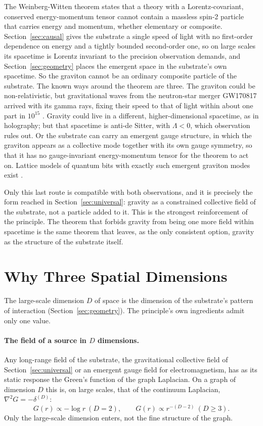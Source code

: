 \documentclass[aps,prd,onecolumn,nofootinbib,superscriptaddress]{revtex4-2}
\begin{document}
The Weinberg-Witten theorem \cite{weinbergwitten1980} states that a theory with a Lorentz-covariant, conserved energy-momentum tensor cannot contain a massless spin-2 particle that carries energy and momentum, whether elementary or composite. Section~\ref{sec:causal} gives the substrate a single speed of light with no first-order dependence on energy and a tightly bounded second-order one, so on large scales its spacetime is Lorentz invariant to the precision observation demands, and Section~\ref{sec:geometry} places the emergent space in the substrate's own spacetime. So the graviton cannot be an ordinary composite particle of the substrate. The known ways around the theorem \cite{carlip2014} are three. The graviton could be non-relativistic, but gravitational waves from the neutron-star merger GW170817 arrived with its gamma rays, fixing their speed to that of light within about one part in $10^{15}$ \cite{gw170817}. Gravity could live in a different, higher-dimensional spacetime, as in holography; but that spacetime is anti-de Sitter, with $\Lambda<0$, which observation rules out. Or the substrate can carry an emergent gauge structure, in which the graviton appears as a collective mode together with its own gauge symmetry, so that it has no gauge-invariant energy-momentum tensor for the theorem to act on. Lattice models of quantum bits with exactly such emergent graviton modes exist \cite{guwen2012}.

Only this last route is compatible with both observations, and it is precisely the form reached in Section~\ref{sec:universal}: gravity as a constrained collective field of the substrate, not a particle added to it. This is the strongest reinforcement of the principle. The theorem that forbids gravity from being one more field within spacetime is the same theorem that leaves, as the only consistent option, gravity as the structure of the substrate itself.

\section{Why Three Spatial Dimensions}
\label{sec:three}

The large-scale dimension $D$ of space is the dimension of the substrate's pattern of interaction (Section~\ref{sec:geometry}). The principle's own ingredients admit only one value.

\paragraph{The field of a source in $D$ dimensions.} Any long-range field of the substrate, the gravitational collective field of Section~\ref{sec:universal} or an emergent gauge field for electromagnetism, has as its static response the Green's function of the graph Laplacian. On a graph of dimension $D$ this is, on large scales, that of the continuum Laplacian, $\nabla^2 G = -\delta^{(D)}$:
\begin{equation}
G(r) \propto -\log r \ (D=2), \qquad G(r) \propto r^{-(D-2)} \ (D\ge 3).
\end{equation}
Only the large-scale dimension enters, not the fine structure of the graph.
\end{document}
